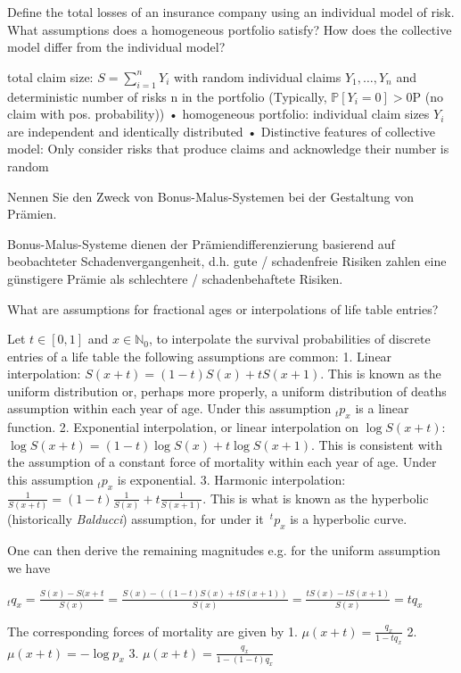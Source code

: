 Define the total losses of an insurance company using an individual model of risk.
What assumptions does a homogeneous portfolio satisfy? How does the collective
model differ from the individual model?

total claim size: \( S = \sum_{i=1}^n Y_i \) with random individual claims \( Y_1, \dots, Y_n \) and
deterministic number of risks n in the portfolio (Typically, \( \mathbb{P}[Y_i = 0] > 0 \)P
(no claim with pos. probability))
• homogeneous portfolio: individual claim sizes \( Y_i \) are independent and
identically distributed
• Distinctive features of collective model: Only consider risks that produce claims
and acknowledge their number is random

Nennen Sie den Zweck von Bonus-Malus-Systemen bei der Gestaltung von Prämien.

Bonus-Malus-Systeme dienen der Prämiendifferenzierung basierend auf beobachteter Schadenvergangenheit, 
d.h. gute / schadenfreie Risiken zahlen eine günstigere Prämie als schlechtere / schadenbehaftete Risiken.



What are assumptions for fractional ages or interpolations of life table entries?


Let \( t \in [0, 1] \) and \( x \in \mathbb{N}_0 \), to interpolate the survival probabilities of discrete entries of a life
table the following  assumptions are common:  
1. Linear interpolation: 
\( S(x + t) = (1 - t) S(x) + t S(x + 1) \). 
This is known as the uniform distribution or, perhaps more properly, a uniform distribution of deaths assumption within each year of age. Under this assumption \( {}_t p_x \) is a linear function.  
2. Exponential interpolation, or linear interpolation on 
\( \log S(x + t) \): \(\log S(x + t) = (1 - t) \log S(x) + t \log S(x + 1).\) 
This is consistent with the assumption of a constant force of mortality within each year of age. Under this assumption \( {}_t p_x \) is exponential.  
3. Harmonic interpolation: 
\(\frac{1}{S(x + t)} = (1 - t) \frac{1}{S(x)} + t \frac{1}{S(x + 1)}.\) 
This is what is known as the hyperbolic (historically \textit{Balducci}) assumption, for under it \( \, ^t p_x \) is a hyperbolic curve.

One can then derive the remaining magnitudes e.g. for the uniform assumption we have

\( {}_t q_x = \frac{S(x) - S(x+t}{S(x)} = \frac{S(x) - ((1-t)S(x) + tS(x+1))}{S(x)} = \frac{tS(x) - tS(x+1)}{S(x)} = tq_x \)

The corresponding forces of mortality are given by
1. \( \mu(x+t) = \frac{q_x}{1 - tq_x} \)
2. \( \mu(x+t) = - \log p_x \)
3. \( \mu(x+t) = \frac{q_x}{1 - (1-t)q_x} \)


